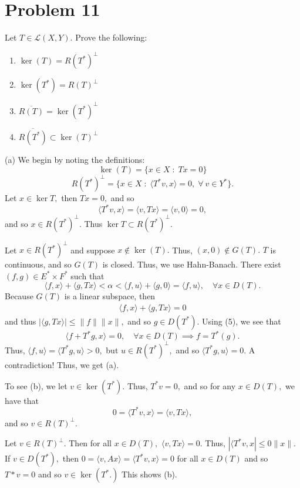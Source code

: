 \documentclass[11pt]{article}
\begin{document}
\section*{Problem 11}
\begin{problem}
    Let $T\in \mathcal{L}(X,Y).$ Prove the following:
    \begin{enumerate}
        \item $\ker(T) = R(T^*)^\perp$
        \item $\ker(T^*) = R(T)^\perp$
        \item $\overline{R(T)} = \ker(T^*)^\perp$
        \item $\overline{R(T^*)} \subset \ker(T)^\perp$
    \end{enumerate}
\end{problem}
\begin{solution}
    (a) We begin by noting the definitions: 
    \[\ker(T) = \{x \in X \; : \; Tx = 0\}\]
    \[R(T^*)^\perp = \{x\in X \; : \; \langle T^*v, x\rangle = 0, \; \forall \: v \in Y^*\}.\]
    Let $x\in \ker T,$ then $Tx = 0,$ and so 
    \[\langle T^* v, x\rangle = \langle v, Tx\rangle=  \langle v, 0\rangle = 0,\] and so $x\in R(T^*)^\perp.$ Thus $\ker T \subset R(T^*)^\perp.$

    Let $x\in R(T^*)^\perp$ and suppose $x\not \in \ker(T).$ Thus, $(x,0)\not \in G(T).$ $T$ is continuous, and so $G(T)$ is closed. Thus, we use Hahn-Banach. There exist $(f,g)\in E^* \times F^*$ such that 
    \[\langle f, x\rangle + \langle g, Tx\rangle < \alpha < \langle f, u \rangle + \langle g, 0\rangle = \langle f, u \rangle, \quad \forall x\in D(T).\] Because $G(T)$ is a linear subspace, then 
    \begin{align}
    \langle f, x\rangle + \langle g, Tx\rangle = 0    
    \end{align}
     and thus $|\langle g, Tx \rangle| \leq \|f\|\|x\|,$ and so $g\in D(T^*).$ Using (5), we see that 
     \[\langle f + T^* g, x\rangle = 0, \quad \forall x\in D(T) \implies f = T^*(g).\] Thus, $\langle f, u \rangle = \langle T^*g, u \rangle >0,$ but $u\in R(T^*)^\perp,$ and so $\langle T^*g, u\rangle = 0.$ A contradiction! Thus, we get (a).

     To see (b), we let $v\in \ker(T^*).$ Thus, $T^*v = 0,$ and so for any $x\in D(T),$ we have that 
     \[0 = \langle T^* v, x \rangle =\langle v, Tx\rangle ,\] and so $v\in R(T)^\perp.$

     Let $v\in R(T)^\perp.$ Then for all $x\in D(T),$ $\langle v, Tx \rangle = 0.$ Thus, $|\langle T^* v, x| \leq 0 \|x\|.$ If $v\in D(T^*),$ then $0 = \langle v, Ax \rangle = \langle T^*v, x \rangle  =0$ for all $x\in D(T)$ and so $T*v = 0$ and so $v\in \ker(T^*.)$ This shows (b).


\end{solution}
\end{document}
